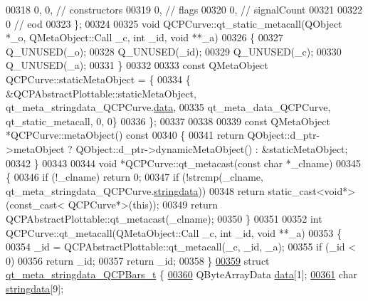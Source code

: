 \begin{DoxyCode}
00318        0,    0, \textcolor{comment}{// constructors}
00319        0,       \textcolor{comment}{// flags}
00320        0,       \textcolor{comment}{// signalCount}
00321 
00322        0        \textcolor{comment}{// eod}
00323 \};
00324 
00325 \textcolor{keywordtype}{void} QCPCurve::qt\_static\_metacall(QObject *\_o, QMetaObject::Call \_c, \textcolor{keywordtype}{int} \_id, \textcolor{keywordtype}{void} **\_a)
00326 \{
00327     Q\_UNUSED(\_o);
00328     Q\_UNUSED(\_id);
00329     Q\_UNUSED(\_c);
00330     Q\_UNUSED(\_a);
00331 \}
00332 
00333 \textcolor{keyword}{const} QMetaObject QCPCurve::staticMetaObject = \{
00334     \{ &QCPAbstractPlottable::staticMetaObject, qt\_meta\_stringdata\_QCPCurve.\hyperlink{a00016_ac2243b1095d588f9864242ffc67f432f}{data},
00335       qt\_meta\_data\_QCPCurve,  qt\_static\_metacall, 0, 0\}
00336 \};
00337 
00338 
00339 \textcolor{keyword}{const} QMetaObject *QCPCurve::metaObject()\textcolor{keyword}{ const}
00340 \textcolor{keyword}{}\{
00341     \textcolor{keywordflow}{return} QObject::d\_ptr->metaObject ? QObject::d\_ptr->dynamicMetaObject() : &staticMetaObject;
00342 \}
00343 
00344 \textcolor{keywordtype}{void} *QCPCurve::qt\_metacast(\textcolor{keyword}{const} \textcolor{keywordtype}{char} *\_clname)
00345 \{
00346     \textcolor{keywordflow}{if} (!\_clname) \textcolor{keywordflow}{return} 0;
00347     \textcolor{keywordflow}{if} (!strcmp(\_clname, qt\_meta\_stringdata\_QCPCurve.\hyperlink{a00016_ad141d5092cc25ae43c6c60a782ca04ee}{stringdata}))
00348         \textcolor{keywordflow}{return} \textcolor{keyword}{static\_cast<}\textcolor{keywordtype}{void}*\textcolor{keyword}{>}(\textcolor{keyword}{const\_cast<} QCPCurve*\textcolor{keyword}{>}(\textcolor{keyword}{this}));
00349     \textcolor{keywordflow}{return} QCPAbstractPlottable::qt\_metacast(\_clname);
00350 \}
00351 
00352 \textcolor{keywordtype}{int} QCPCurve::qt\_metacall(QMetaObject::Call \_c, \textcolor{keywordtype}{int} \_id, \textcolor{keywordtype}{void} **\_a)
00353 \{
00354     \_id = QCPAbstractPlottable::qt\_metacall(\_c, \_id, \_a);
00355     \textcolor{keywordflow}{if} (\_id < 0)
00356         \textcolor{keywordflow}{return} \_id;
00357     \textcolor{keywordflow}{return} \_id;
00358 \}
\hypertarget{a00016_source_l00359}{}\hyperlink{a00016}{00359} \textcolor{keyword}{struct }\hyperlink{a00016_d4/d3a/a00101}{qt\_meta\_stringdata\_QCPBars\_t} \{
\hypertarget{a00016_source_l00360}{}\hyperlink{a00016_a5237dfd2ea3d5be916ce7c562d734ff4}{00360}     QByteArrayData \hyperlink{a00016_a5237dfd2ea3d5be916ce7c562d734ff4}{data}[1];
\hypertarget{a00016_source_l00361}{}\hyperlink{a00016_a07ece80e538a4239e2a3b6d4b9782407}{00361}     \textcolor{keywordtype}{char} \hyperlink{a00016_a07ece80e538a4239e2a3b6d4b9782407}{stringdata}[9];

\end{DoxyCode}

